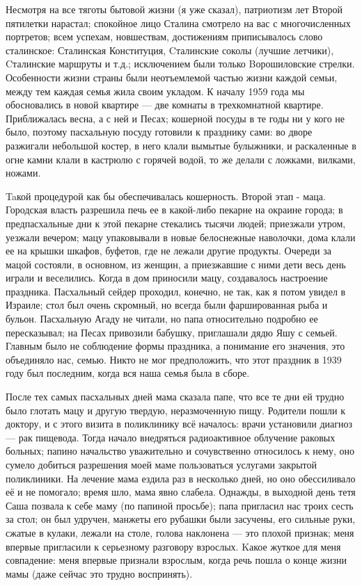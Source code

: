 \label{178-1}
Несмотря на все тяготы бытовой жизни (я уже сказал), патриотизм лет Второй пятилетки нарастал; спокойное лицо Сталина смотрело на вас с многочисленных портретов; всем успехам, новшествам, достижениям приписывалось слово сталинское: Сталинская Конституция, Cталинские соколы (лучшие летчики), Cталинские маршруты и т.д.; исключением были только Bорошиловские стрелки. Особенности жизни страны были неотъемлемой частью жизни каждой семьи, между тем каждая семья жила своим укладом. К началу 1959 года мы обосновались в новой квартире — две комнаты в трехкомнатной квартире. Приближалась весна, а с ней и Песах; кошерной посуды в те годы ни у кого не было, поэтому пасхальную посуду готовили к празднику сами: во дворе разжигали небольшой костер, в него клали вымытые булыжники, и раскаленные в огне камни клали в кастрюлю с горячей водой, то же делали с ложками, вилками, ножами.

\label{179-1}
Taкой процедурой как бы обеспечивалась кошерность. Второй этап - маца. Городская власть разрешила печь ее в какой-либо пекарне на окраине города; в предпасхальные дни к этой пекарне стекались тысячи людей; приезжали утром, уезжали вечером; мацу упаковывали в новые белоснежные наволочки, дома клали ее на крышки шкафов, буфетов, где не лежали другие продукты. Очереди за мацой состояли, в основном, из женщин, а приезжавшие с ними дети весь день играли и веселились. Когда в дом приносили мацу, создавалось настроение праздника. Пасхальный сейдер проходил, конечно, не так, как я потом увидел в Израиле; стол был очень скромный, но всегда были фаршированная рыба и бульон. Пасхальную Агаду не читали, но папа относительно подробно ее пересказывал; на Песах привозили бабушку, приглашали дядю Яшу с семьей. Главным было не соблюдение формы праздника, а понимание его значения, это объединяло нас, семью. Никто не мог предположить, что этот праздник в 1939 году был последним, когда вся наша семья была в сборе.

\label{180-1}
После тех самых пасхальных дней мама сказала папе, что все те дни ей трудно было глотать мацу и другую твердую,
неразмоченную пищу. Родители пошли к доктору, и с этого визита в поликлинику всё началось: врачи установили диагноз — рак пищевода. Тогда начало внедряться радиоактивное облучение раковых больных; папино начальство уважительно и сочувственно относилось к нему, оно сумело добиться разрешения моей маме пользоваться услугами закрытой поликлиники. На лечение мама ездила раз в несколько дней, но оно обессиливало её и не помогало; время шло, мама явно слабела. Однажды, в выходной день тетя Саша позвала к себе маму (по папиной просьбе); папа пригласил нас троих сесть за стол; он был удручен, манжеты его рубашки были засучены, его сильные руки, сжатые в кулаки, лежали на столе, голова наклонена — это плохой признак; меня впервые пригласили к серьезному разговору взрослых. Kакое жуткое для меня совпадение: меня впервые признали взрослым, когда речь пошла о конце жизни мамы (даже сейчас это трудно воспринять).

